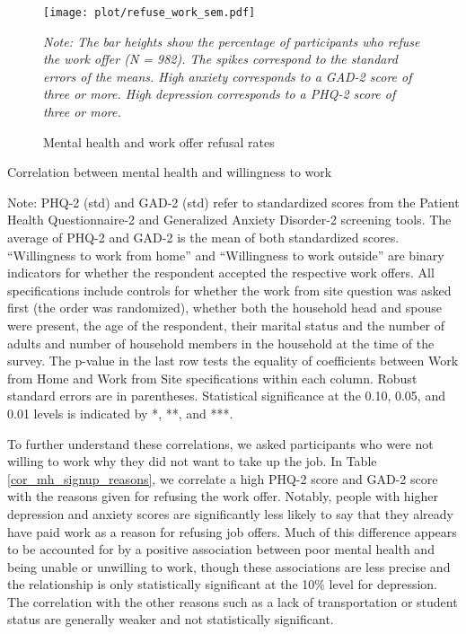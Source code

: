 \documentclass[12pt, a4paper, american]{article}
\begin{document}
 \begin{figure}[H]
     \centering
     \texttt{[image: plot/refuse\_work\_sem.pdf]}
     \caption{Mental health and work offer refusal rates}\label{fig_mh_refusal}
     \flushleft
         \small\textit{Note: The bar heights show the percentage of participants who refuse the work offer (N = 982). The spikes correspond to the standard errors of the means. High anxiety corresponds to a GAD-2 score of three or more. High depression corresponds to a PHQ-2 score of three or more. }
   \end{figure}

\begin{table}\caption{Correlation between mental health and willingness to work}\label{cor_mh_signup}
\centering
\begin{threeparttable}

\begin{tablenotes}
\small \item Note: PHQ-2 (std) and GAD-2 (std) refer to standardized scores from the Patient Health Questionnaire-2 and Generalized Anxiety Disorder-2 screening tools. The average of PHQ-2 and GAD-2 is the mean of both standardized scores. ``Willingness to work from home'' and ``Willingness to work outside'' are binary indicators for whether the respondent accepted the respective work offers. All specifications include controls for whether the work from site question was asked first (the order was randomized), whether both the household head and spouse were present, the age of the respondent, their marital status and the number of adults and number of household members in the household  at the time of the survey. The p-value in the last row tests the equality of coefficients between Work from Home and Work from Site specifications within each column. Robust standard errors are in parentheses. Statistical significance at the 0.10, 0.05, and 0.01 levels is indicated by *, **, and ***.
\end{tablenotes}
\end{threeparttable}
\end{table}

To further understand these correlations, we asked participants who were not willing to work why they did not want to take up the job. In Table \ref{cor_mh_signup_reasons}, we correlate a high PHQ-2 score and GAD-2 score with the reasons given for refusing the work offer. Notably, people with higher depression and anxiety scores are significantly less likely to say that they already have paid work as a reason for refusing job offers. Much of this difference appears to be accounted for by a positive association between poor mental health and being unable or unwilling to work, though these associations are less precise and the relationship is only statistically significant at the 10\% level for depression. The correlation with the other reasons such as a lack of transportation or student status are generally weaker and not statistically significant.
\end{document}
